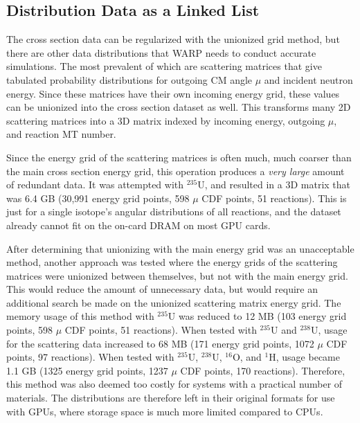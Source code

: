 \subsection{Distribution Data as a Linked List}

The cross section data can be regularized with the unionized grid method, but there are other data distributions that WARP needs to conduct accurate simulations.  The most prevalent of which are scattering matrices that give tabulated probability distributions for outgoing CM angle $\mu$ and incident neutron energy.  Since these matrices have their own incoming energy grid, these values can be unionized into the cross section dataset as well.  This transforms many 2D scattering matrices into a 3D matrix indexed by incoming energy, outgoing $\mu$, and reaction MT number.  

Since the energy grid of the scattering matrices is often much, much coarser than the main cross section energy grid, this operation produces a \emph{very large} amount of redundant data.  It was attempted with $^{235}$U, and resulted in a 3D matrix that was 6.4 GB (30,991 energy grid points, 598 $\mu$ CDF points, 51 reactions).  This is just for a single isotope's angular distributions of all reactions, and the dataset already cannot fit on the on-card DRAM on most GPU cards.  

After determining that unionizing with the main energy grid was an unacceptable method, another approach was tested where the energy grids of the scattering matrices were unionized between themselves, but not with the main energy grid.  This would reduce the amount of unnecessary data, but would require an additional search be made on the unionized scattering matrix energy grid.  The memory usage of this method with $^{235}$U was reduced to 12 MB (103 energy grid points, 598 $\mu$ CDF points, 51 reactions).  When tested with $^{235}$U and $^{238}$U, usage for the scattering data increased to 68 MB (171 energy grid points, 1072 $\mu$ CDF points, 97 reactions).  When tested with $^{235}$U, $^{238}$U, $^{16}$O, and $^{1}$H, usage became 1.1 GB (1325 energy grid points, 1237 $\mu$ CDF points, 170 reactions).  Therefore, this method was also deemed too costly for systems with a practical number of materials.  The distributions are therefore left in their original formats for use with GPUs, where storage space is much more limited compared to CPUs.


